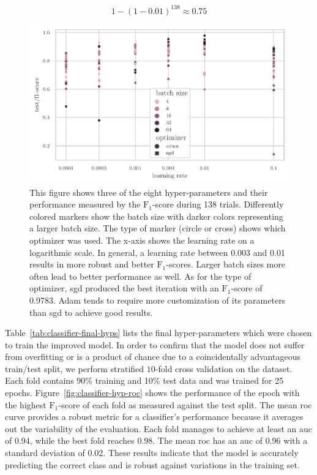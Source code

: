 \documentclass[draft,final]{vutinfth} %
\begin{document}
\begin{equation}\label{eq:opt-prob}
  1 - (1 - 0.01)^{138} \approx 0.75
\end{equation}

\begin{figure}
  \centering
  \includegraphics{graphics/classifier-hyp-metrics.pdf}
  \caption[Classifier hyper-parameter optimization results.]{This
    figure shows three of the eight hyper-parameters and their
    performance measured by the $\mathrm{F}_1$-score during 138
    trials. Differently colored markers show the batch size with
    darker colors representing a larger batch size. The type of marker
    (circle or cross) shows which optimizer was used. The x-axis shows
    the learning rate on a logarithmic scale. In general, a learning
    rate between 0.003 and 0.01 results in more robust and better
    $\mathrm{F}_1$-scores. Larger batch sizes more often lead to
    better performance as well. As for the type of optimizer,
    \gls{sgd} produced the best iteration with an $\mathrm{F}_1$-score
    of 0.9783. Adam tends to require more customization of its
    parameters than \gls{sgd} to achieve good results.}
  \label{fig:classifier-hyp-results}
\end{figure}

Table~\ref{tab:classifier-final-hyps} lists the final hyper-parameters
which were chosen to train the improved model. In order to confirm
that the model does not suffer from overfitting or is a product of
chance due to a coincidentally advantageous train/test split, we
perform stratified $10$-fold cross validation on the dataset. Each
fold contains 90\% training and 10\% test data and was trained for 25
epochs. Figure~\ref{fig:classifier-hyp-roc} shows the performance of
the epoch with the highest $\mathrm{F}_1$-score of each fold as
measured against the test split. The mean \gls{roc} curve provides a
robust metric for a classifier's performance because it averages out
the variability of the evaluation. Each fold manages to achieve at
least an \gls{auc} of 0.94, while the best fold reaches 0.98. The mean
\gls{roc} has an \gls{auc} of 0.96 with a standard deviation of
0.02. These results indicate that the model is accurately predicting
the correct class and is robust against variations in the training
set.
\end{document}
